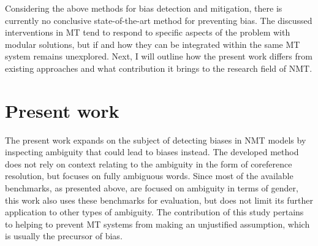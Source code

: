 Considering the above methods for bias detection and mitigation, there is currently no conclusive state-of-the-art method for preventing bias. The discussed interventions in MT tend to respond to specific aspects of the problem with modular solutions, but if and how they can be integrated within the same MT system remains unexplored. Next, I will outline how the present work differs from existing approaches and what contribution it brings to the research field of NMT.

 



\section{Present work}
\label{sec:Related_work:Present_work}

The present work expands on the subject of detecting biases in NMT models by inspecting ambiguity that could lead to biases instead. The developed method does not rely on context relating to the ambiguity in the form of coreference resolution, but focuses on fully ambiguous words. Since most of the available benchmarks, as presented above, are focused on ambiguity in terms of gender, this work also uses these benchmarks for evaluation, but does not limit its further application to other types of ambiguity. The contribution of this study pertains to helping to prevent MT systems from making an unjustified assumption, which is usually the precursor of bias.

